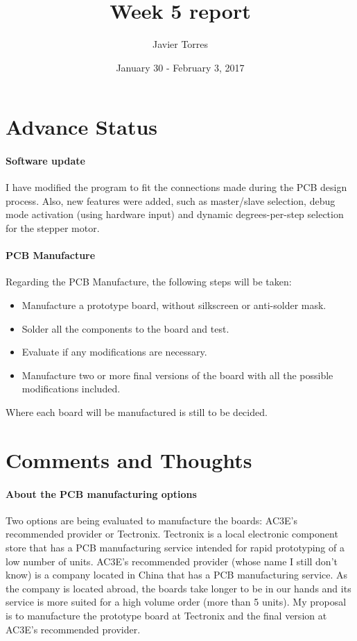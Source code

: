 \documentclass{article}
\title{Week 5 report}
\author{Javier Torres}
\date{January 30 - February 3, 2017}
\begin{document}
\maketitle

\tableofcontents

\section{Advance Status}

\paragraph{Software update}
I have modified the program to fit the connections made during the PCB design process. Also, new features were added, such as master/slave selection, debug mode activation (using hardware input) and dynamic degrees-per-step selection for the stepper motor.

\paragraph{PCB Manufacture}
Regarding the PCB Manufacture, the following steps will be taken:
\begin{itemize}
\item Manufacture a prototype board, without silkscreen or anti-solder mask.
\item Solder all the components to the board and test.
\item Evaluate if any modifications are necessary.
\item Manufacture two or more final versions of the board with all the possible modifications included.
\end{itemize}
Where each board will be manufactured is still to be decided.

\section{Comments and Thoughts}

\paragraph{About the PCB manufacturing options}
Two options are being evaluated to manufacture the boards: AC3E's recommended provider or Tectronix.
Tectronix is a local electronic component store that has a PCB manufacturing service intended for rapid prototyping of a low number of units. 
AC3E's recommended provider (whose name I still don't know) is a company located in China that has a PCB manufacturing service. As the company is located abroad, the boards take longer to be in our hands and its service is more suited for a high volume order (more than 5 units).
My proposal is to manufacture the prototype board at Tectronix and the final version at AC3E's recommended provider.
\end{document}
